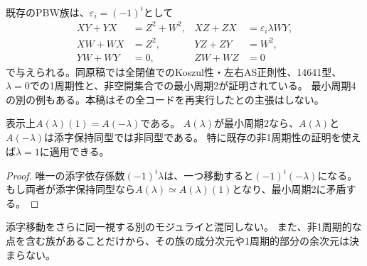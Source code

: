 既存のPBW族\cite{as4period}は、$\varepsilon_i=(-1)^i$として
\begin{equation}\label{eq:period-two-family}
\begin{aligned}
 XY+YX&=Z^2+W^2,& XZ+ZX&=\varepsilon_i\lambda WY,\\
 XW+WX&=Z^2,&YZ+ZY&=W^2,\\
 YW+WY&=0,&ZW+WZ&=0
\end{aligned}
\end{equation}
で与えられる。同原稿では全閉値でのKoszul性・左右AS正則性、14641型、
$\lambda=0$での1周期性と、非空開集合での最小周期2が証明されている。
最小周期4の別の例もある。本稿はその全コードを再実行したとの主張はしない。

\begin{proposition}\label{prop:period-two-sign}
表示上$A(\lambda)(1)=A(-\lambda)$である。
$A(\lambda)$が最小周期2なら、$A(\lambda)$と$A(-\lambda)$は添字保持同型では非同型である。
特に既存の非1周期性の証明を使えば$\lambda=1$に適用できる。
\end{proposition}
\begin{proof}
唯一の添字依存係数$(-1)^i\lambda$は、一つ移動すると$(-1)^i(-\lambda)$になる。
もし両者が添字保持同型なら$A(\lambda)\simeq A(\lambda)(1)$となり、最小周期2に矛盾する。
\end{proof}
\begin{remark}
添字移動をさらに同一視する別のモジュライと混同しない。
また、非1周期的な点を含む族があることだけから、その族の成分次元や1周期的部分の余次元は決まらない。
\end{remark}

